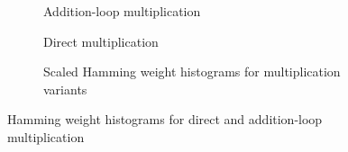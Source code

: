 \begin{figure}[hp]
  \centering
  \begin{subfigure}[b]{0.49\textwidth}
    
    \caption{Addition-loop multiplication}
  \end{subfigure}
  \begin{subfigure}[b]{0.49\textwidth}
    
    \caption{Direct multiplication}
  \end{subfigure}

  \begin{subfigure}[b]{\textwidth}
    
    \caption{Scaled Hamming weight histograms for multiplication variants}
  \end{subfigure}
  \caption{Hamming weight histograms for direct and addition-loop multiplication}
  \label{fig:mult-comparison}
\end{figure}

